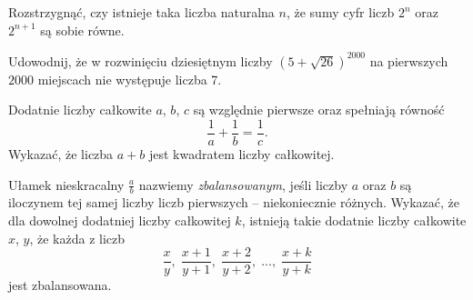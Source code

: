 


\noindent
Rozstrzygnąć, czy istnieje taka liczba naturalna $n$, że sumy cyfr liczb $2^n$ oraz $2^{n + 1}$ są sobie równe.





\noindent
Udowodnij, że w rozwinięciu dziesiętnym liczby $(5 + \sqrt{26})^{2000}$ na pierwszych $2000$ miejscach nie występuje liczba 7.



\noindent
Dodatnie liczby całkowite $a$, $b$, $c$ są względnie pierwsze oraz spełniają równość
\[
	\frac{1}{a} + \frac{1}{b} = \frac{1}{c}.
\]
Wykazać, że liczba $a + b$ jest kwadratem liczby całkowitej.



\noindent
Ułamek nieskracalny $\frac{a}{b}$ nazwiemy \textit{zbalansowanym}, jeśli liczby $a$ oraz $b$ są iloczynem tej samej liczby liczb pierwszych -- niekoniecznie różnych. Wykazać, że dla dowolnej dodatniej liczby całkowitej $k$, istnieją takie dodatnie liczby całkowite $x$, $y$, że każda z liczb
\[
	\frac{x}{y}, \; \frac{x + 1}{y + 1}, \; \frac{x + 2}{y + 2}, \; ..., \; \frac{x + k}{y + k}
\]  
jest zbalansowana.





